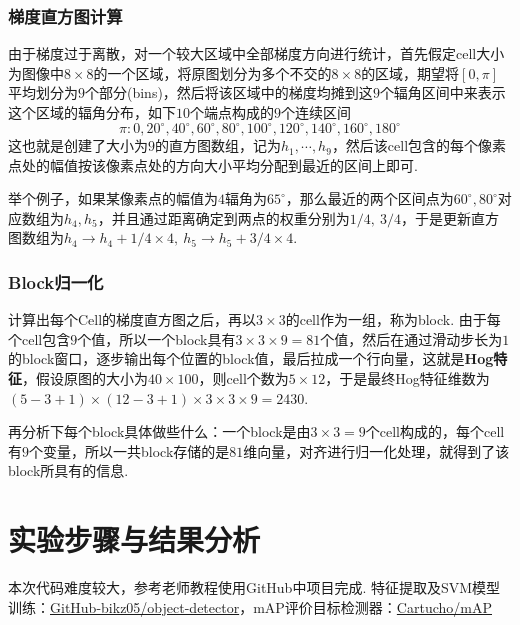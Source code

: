\documentclass[12pt, a4paper, oneside]{ctexart}
\numberwithin{equation}{section}  %
\begin{document}
\subsubsection{梯度直方图计算}
由于梯度过于离散，对一个较大区域中全部梯度方向进行统计，首先假定cell大小为图像中$8\times 8$的一个区域，将原图划分为多个不交的$8\times 8$的区域，期望将$[0,\pi]$平均划分为$9$个部分(bins)，然后将该区域中的梯度均摊到这$9$个辐角区间中来表示这个区域的辐角分布，如下$10$个端点构成的$9$个连续区间
\begin{equation*}
  \pi: 0,20^\circ, 40^\circ, 60^\circ, 80^\circ, 100^\circ, 120^\circ, 140^\circ, 160^\circ, 180^\circ
\end{equation*}
这也就是创建了大小为$9$的直方图数组，记为$h_1,\cdots,h_9$，然后该cell包含的每个像素点处的幅值按该像素点处的方向大小平均分配到最近的区间上即可.

举个例子，如果某像素点的幅值为$4$辐角为$65^\circ$，那么最近的两个区间点为$60^\circ, 80^\circ$对应数组为$h_4,h_5$，并且通过距离确定到两点的权重分别为$1/4,\ 3/4$，于是更新直方图数组为$h_4\rightarrow h_4+1/4\times 4,\ h_5\rightarrow h_5+3/4\times 4$.
\subsubsection{Block归一化}
计算出每个Cell的梯度直方图之后，再以$3\times 3$的cell作为一组，称为block. 由于每个cell包含$9$个值，所以一个block具有$3\times 3\times 9=81$个值，然后在通过滑动步长为$1$的block窗口，逐步输出每个位置的block值，最后拉成一个行向量，这就是\textbf{Hog特征}，假设原图的大小为$40\times 100$，则cell个数为$5\times 12$，于是最终Hog特征维数为$(5-3+1)\times(12-3+1)\times 3\times 3\times 9 = 2430$.

再分析下每个block具体做些什么：一个block是由$3\times 3 = 9$个cell构成的，每个cell有$9$个变量，所以一共block存储的是$81$维向量，对齐进行归一化处理，就得到了该block所具有的信息.

\section{实验步骤与结果分析}
本次代码难度较大，参考老师教程使用GitHub中项目完成. 特征提取及SVM模型训练：\href{https://github.com/bikz05/object-detector/tree/master/object-detector}{GitHub-bikz05/object-detector}，mAP评价目标检测器：\href{https://github.com/Cartucho/mAP}{Cartucho/mAP}
\end{document}
